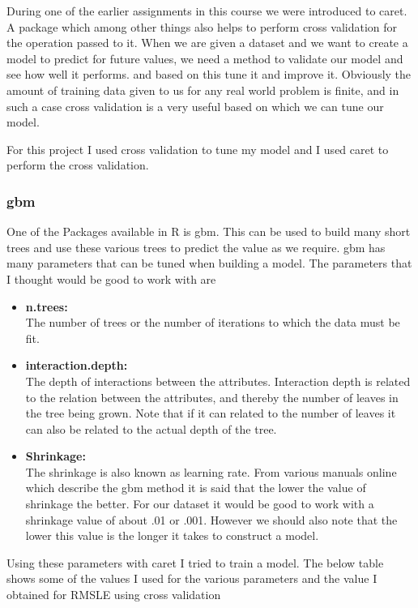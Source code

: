\documentclass[paper=a4, fontsize=11pt]{scrartcl}	%
\numberwithin{equation}{section}		%
\numberwithin{figure}{section}			%
\numberwithin{table}{section}				%
\begin{document}
During one of the earlier assignments in this course we were introduced to caret. A package which among other things also helps to perform cross validation for the operation passed to it. When we are given a dataset and we want to create a model to predict for future values, we need a method to validate our model and see how well it performs. and based on this tune it and improve it. Obviously the amount of training data given to us for any real world problem is finite, and in such a case cross validation is a very useful based on which we can tune our model.

For this project I used cross validation to tune my model and I used caret to perform the cross validation.

\subsubsection{gbm}

One of the Packages available in R is gbm. This can be used to build many short trees and use these various trees to predict the value as we require. gbm has many parameters that can be tuned when building a model. The parameters that I thought would be good to work with are

\begin{itemize}
	\item
	\textbf{n.trees:}\\
		The number of trees or the number of iterations to which the data must be fit.
	\item
	\textbf{interaction.depth:}\\
		The depth of interactions between the attributes. Interaction depth is related to the relation between the attributes, and thereby the number of leaves in the tree being grown. Note that if it can related to the number of leaves it can also be related to the actual depth of the tree.
	\item
	\textbf{Shrinkage:}\\
		The shrinkage is also known as learning rate. From various manuals online which describe the gbm method it is said that the lower the value of shrinkage the better. For our dataset it would be good to work with a shrinkage value of about .01 or .001. However we should also note that the lower this value is the longer it takes to construct a model.
\end{itemize}

Using these parameters with caret I tried to train a model. The below table shows some of the values I used for the various parameters and the value I obtained for RMSLE using cross validation
\end{document}
